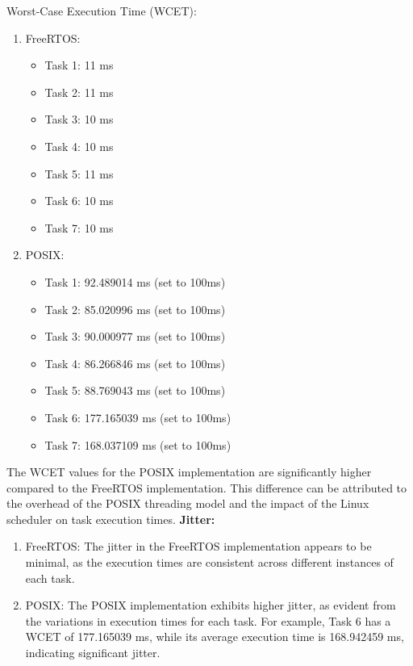 \documentclass[a4paper,11pt]{article}%
\newenvironment{qanda}{\setlength{\parindent}{0pt}}{\bigskip}
\begin{document}
\begin{qanda}
\begin{enumerate}
			Worst-Case Execution Time (WCET):\\
			\begin{enumerate}
				\item FreeRTOS:
				      \begin{itemize}
					      \item Task 1: 11 ms
					      \item Task 2: 11 ms
					      \item Task 3: 10 ms
					      \item Task 4: 10 ms
					      \item Task 5: 11 ms
					      \item Task 6: 10 ms
					      \item Task 7: 10 ms
				      \end{itemize}
				\item POSIX:
				      \begin{itemize}
					      \item Task 1: 92.489014 ms (set to 100ms)
					      \item Task 2: 85.020996 ms (set to 100ms)
					      \item Task 3: 90.000977 ms (set to 100ms)
					      \item Task 4: 86.266846 ms (set to 100ms)
					      \item Task 5: 88.769043 ms (set to 100ms)
					      \item Task 6: 177.165039 ms (set to 100ms)
					      \item Task 7: 168.037109 ms (set to 100ms)
				      \end{itemize}

			\end{enumerate}


			The WCET values for the POSIX implementation are significantly higher compared to the FreeRTOS implementation. This difference can be attributed to the overhead of the POSIX threading model and the impact of the Linux scheduler on task execution times.
			\textbf{Jitter:}
			\begin{enumerate}
				\item FreeRTOS: The jitter in the FreeRTOS implementation appears to be minimal, as the execution times are consistent across different instances of each task.
				\item POSIX: The POSIX implementation exhibits higher jitter, as evident from the variations in execution times for each task. For example, Task 6 has a WCET of 177.165039 ms, while its average execution time is 168.942459 ms, indicating significant jitter.
			\end{enumerate}


\end{enumerate}
\end{qanda}
\end{document}
